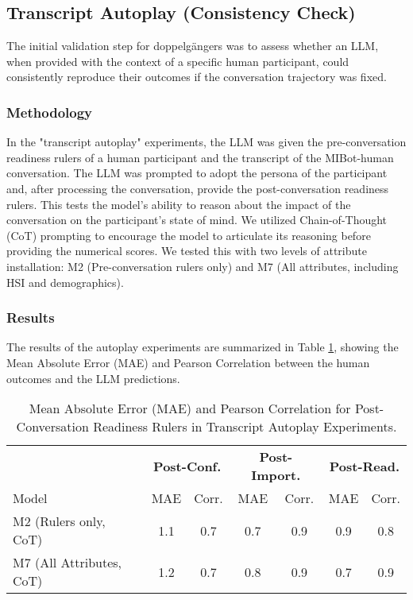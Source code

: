 \subsection{Transcript Autoplay (Consistency Check)}

The initial validation step for doppelgängers was to assess whether an LLM, when provided with the context of a specific human participant, could consistently reproduce their outcomes if the conversation trajectory was fixed.

\subsubsection{Methodology}

In the "transcript autoplay" experiments, the LLM was given the pre-conversation readiness rulers of a human participant and the transcript of the MIBot-human conversation. The LLM was prompted to adopt the persona of the participant and, after processing the conversation, provide the post-conversation readiness rulers. This tests the model's ability to reason about the impact of the conversation on the participant's state of mind. We utilized Chain-of-Thought (CoT) prompting to encourage the model to articulate its reasoning before providing the numerical scores. We tested this with two levels of attribute installation: M2 (Pre-conversation rulers only) and M7 (All attributes, including HSI and demographics).

\subsubsection{Results}

The results of the autoplay experiments are summarized in Table \ref{tab:autoplay_results}, showing the Mean Absolute Error (MAE) and Pearson Correlation between the human outcomes and the LLM predictions.

\begin{table}[h]
\centering
\caption{Mean Absolute Error (MAE) and Pearson Correlation for Post-Conversation Readiness Rulers in Transcript Autoplay Experiments.}
\label{tab:autoplay_results}
\begin{tabular}{|l|cc|cc|cc|}
\hline
 & \multicolumn{2}{c|}{\textbf{Post-Conf.}} & \multicolumn{2}{c|}{\textbf{Post-Import.}} & \multicolumn{2}{c|}{\textbf{Post-Read.}} \\
Model & MAE & Corr. & MAE & Corr. & MAE & Corr. \\ \hline
M2 (Rulers only, CoT) & 1.1 & 0.7 & 0.7 & 0.9 & 0.9 & 0.8 \\
M7 (All Attributes, CoT) & 1.2 & 0.7 & 0.8 & 0.9 & 0.7 & 0.9 \\ \hline
\end{tabular}
\end{table}

